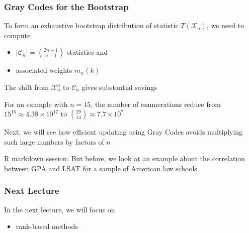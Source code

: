 \documentclass[10pt]{beamer}
\begin{document}
\begin{frame}
\frametitle{Gray Codes for the Bootstrap}

To form an exhaustive bootstrap distribution of statistic $T(\mathcal{X}_n)$, \newline
we need to compute  
\begin{itemize}
\item $|\mathcal{C}_n| = \binom{2n-1 }{n-1}$ statistics and 
\item associated weights $m_n(k)$
\end{itemize}

\vspace{0.3cm}
The shift from $\mathcal{X}_n^n$ to $\mathcal{C}_n$ gives substantial savings \newline

For an example with $n = 15$, the number of enumerations reduce from $15^{15} \approx 4.38 \times 10^{17}$ to $\binom{29}{14} \approx 7.7 \times 10^7$ \newline

Next, we will see how efficient updating using Gray Codes avoids multiplying such large numbers by factors of $n$ \newline

\alert{R markdown session:} But before, we look at an example about the correlation between GPA and LSAT for a sample of American law schools

\end{frame}

\begin{frame}
\frametitle{Next Lecture}

In the next lecture, we will focus on
\begin{itemize}
\item rank-based methods
\end{itemize}

\end{frame}
\end{document}
